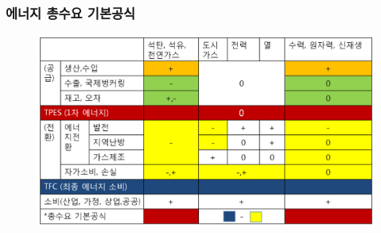 \documentclass[10pt,compress,slidetop,%
			   hyperref={unicode},xcolor={svgnames},%
			   t]{beamer}
\begin{document}
%
\begin{frame}
	\frametitle{에너지 총수요 기본공식}
	  	\begin{figure}
	\centering
	 \includegraphics[width=1.00\textwidth]{Edformula.png}
	\end{figure}	

\end{frame}
\end{document}
